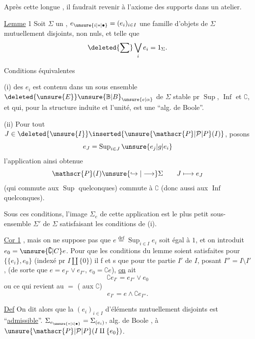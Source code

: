 Après cette longue , il faudrait revenir à l'axiome des supports dans un atelier.

\uline{Lemme} 1 Soit $\Sigma$ un , $e_{\unsure{i|\ast|\bullet}}=(e_i)_{i\in I}$ une famille d'objets de $\Sigma$ mutuellement disjoints,  non nuls, et telle que
\[
\deleted{\sum}\bigvee_i e_i=1_{\Sigma}.
\]

Conditions équivalentes

(i)  des $e_i$ est contenu dans un sous ensemble $\deleted{\unsure{E}}\unsure{\mathbb{B}|B}_{\unsure{e|\alpha}}$ de $\Sigma$ stable pr  $\operatorname{Sup}$,  $\operatorname{Inf}$ et $\complement$, et qui, pour la structure induite et l'unité, est une ``alg. de Boole''.

(ii)  Pour tout $J\in\deleted{\unsure{I}}\inserted{\unsure{\mathscr{P}|\mathcal{P}|P}(I)}$, posons
\[
e_J=\operatorname{Sup}_{i\in J}\unsure{e_j|g|e_i}
\]
l'application ainsi obtenue
\[
\mathscr{P}(I)\unsure{\hookrightarrow|\longrightarrow}\Sigma\qquad J\longmapsto e_J
\]
(qui commute  aux $\operatorname{Sup}$ quelconques) commute à $\complement$ (donc aussi aux $\operatorname{Inf}$ quelconques).

Sous ces conditions,  l'image $\Sigma_e$ de cette application est le plus petit sous-ensemble $\Sigma'$ de $\Sigma$ satisfaisant les conditions de (i).

\uline{Cor 1}  , mais on ne suppose pas que $e\overset{\mathrm{def}}{=}\operatorname{Sup}_{i\in I}e_i$ soit égal à $1$, et on introduit $e_0=\unsure{\complement|C}e$. Pour que les conditions du lemme soient satisfaites pour $\{\{e_i\},e_0\}$ (indexé pr $I\amalg\{0\}$) il f et s que  pour tte partie $I'$ de $I$, posant $I''=I\setminus I'$, (de sorte que $e=e_{I'}\vee e_{I''}$,  $e_0=\complement e$),  \uline{on} ait
\[
\complement e_{I'}=e_{I''}\vee e_0
\]
ou ce qui revient au $=$ ( aux $\complement$)
\[
e_{I'}=e\wedge\complement e_{I''}.
\]

\uline{Def} On dit alors que la  $(e_i)_{i\in I}$ d'éléments mutuellement disjoints est ``\uline{admissible}''. $\Sigma_{e_{\unsure{\ast|i|\bullet}}}=\Sigma_{(e_i)}$, alg. de Boole ,  à $\unsure{\mathscr{P}|\mathcal{P}|P}(I\amalg\{e_0\})$.

